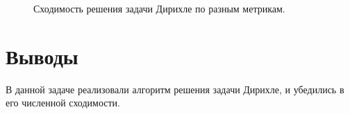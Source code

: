 \documentclass{article}
\begin{document}
\begin{figure}[h!]
\begin{minipage}{.50\textwidth}
        
        \label{fig:stable}
    
    \end{minipage}

    \caption{Сходимость решения задачи Дирихле по разным метрикам.}
    \label{fig1}
    
\end{figure}


\section{Выводы}

В данной задаче реализовали алгоритм решения задачи Дирихле, и убедились в его численной сходимости.
\end{document}
